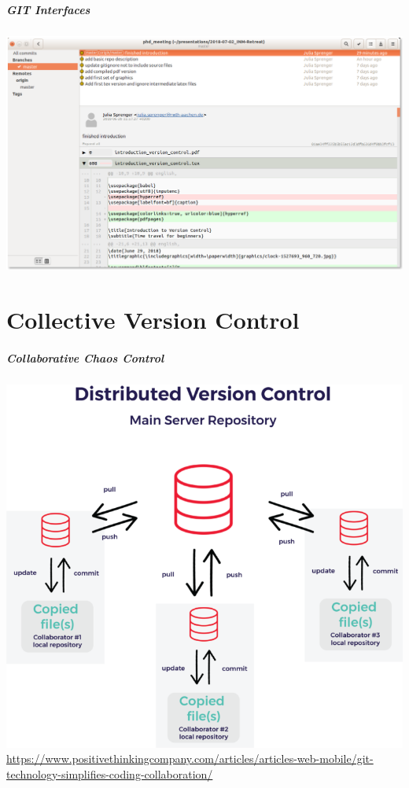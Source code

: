 \documentclass[
t, %
10pt, %
aspectratio=1610, %
ngerman,
english,
]{beamer}
\begin{document}
\begin{frame}
    \frametitle{GIT Interfaces}
    \centering
    \includegraphics[height=0.8\textheight]{graphics/Screenshot_gitg.png}\\
\end{frame}

\part{Collective Version Control}
\makepart

\begin{frame}
    \frametitle{Collaborative Chaos Control}
    \centering
    \includegraphics[height=0.7\textheight]{graphics/DVC-distributed-version-control-768x704.png}\\
    \url{https://www.positivethinkingcompany.com/articles/articles-web-mobile/git-technology-simplifies-coding-collaboration/}
\end{frame}
\end{document}
